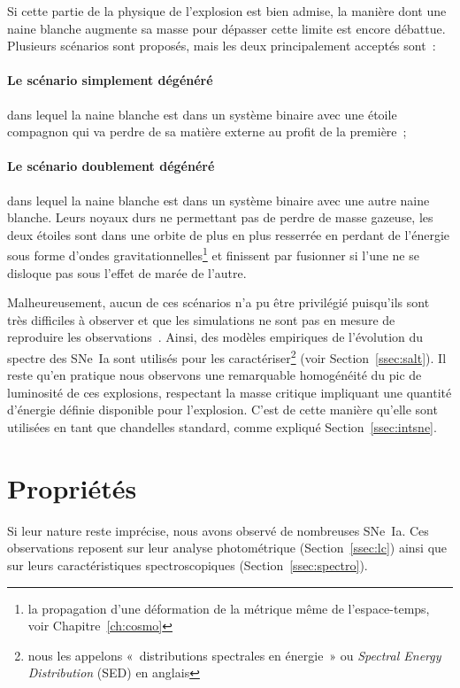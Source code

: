 \documentclass[../main/main.tex]{subfiles}
\begin{document}
Si cette partie de la physique de l'explosion est bien admise, la manière dont
une naine blanche augmente sa masse pour dépasser cette limite est encore
débattue. Plusieurs scénarios sont proposés, mais les deux principalement
acceptés sont~:
\paragraph*{Le scénario simplement dégénéré\!\!} \citep{whelan1973} dans lequel la
naine blanche est dans un système binaire avec une étoile compagnon qui va
perdre de sa matière externe au profit de la première~;
\paragraph*{Le scénario doublement dégénéré\!\!} \citep{webbink1984} dans lequel
la naine blanche est dans un système binaire avec une autre naine blanche. Leurs
noyaux durs ne permettant pas de perdre de masse gazeuse, les deux étoiles sont
dans une orbite de plus en plus resserrée en perdant de l'énergie sous forme
d'ondes gravitationnelles\footnote{la propagation d'une déformation de la
métrique même de l'espace-temps, voir Chapitre~\ref{ch:cosmo}} et finissent par
fusionner si l'une ne se disloque pas sous l'effet de marée de l'autre.

Malheureusement, aucun de ces scénarios n'a pu être privilégié puisqu'ils sont
très difficiles à observer et que les simulations ne sont pas en mesure de
reproduire les observations~\citep{ropke2012}. Ainsi, des modèles empiriques de
l'évolution du spectre des SNe~Ia sont utilisés pour les
caractériser\footnote{nous les appelons «~distributions spectrales en énergie~»
ou \textit{Spectral Energy Distribution} (SED) en anglais} (voir
Section~\ref{ssec:salt}). Il reste qu'en pratique nous observons une remarquable
homogénéité du pic de luminosité de ces explosions, respectant la masse critique
impliquant une quantité d'énergie définie disponible pour l'explosion. C'est de
cette manière qu'elle sont utilisées en tant que chandelles standard, comme
expliqué Section~\ref{ssec:intsne}.

\section{Propriétés}\label{sec:sneprop}

Si leur nature reste imprécise, nous avons observé de nombreuses SNe~Ia. Ces
observations reposent sur leur analyse photométrique (Section~\ref{ssec:lc})
ainsi que sur leurs caractéristiques spectroscopiques
(Section~\ref{ssec:spectro}).
\end{document}

